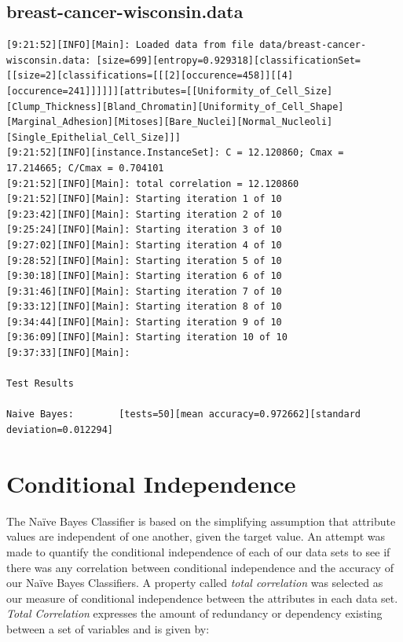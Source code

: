 \documentclass[10pt]{report}
\begin{document}
\subsection*{breast-cancer-wisconsin.data}
{\small
\begin{verbatim}
[9:21:52][INFO][Main]: Loaded data from file data/breast-cancer-wisconsin.data: [size=699][entropy=0.929318][classificationSet=[[size=2][classifications=[[[2][occurence=458]][[4][occurence=241]]]]]][attributes=[[Uniformity_of_Cell_Size][Clump_Thickness][Bland_Chromatin][Uniformity_of_Cell_Shape][Marginal_Adhesion][Mitoses][Bare_Nuclei][Normal_Nucleoli][Single_Epithelial_Cell_Size]]] 
[9:21:52][INFO][instance.InstanceSet]: C = 12.120860; Cmax = 17.214665; C/Cmax = 0.704101 
[9:21:52][INFO][Main]: total correlation = 12.120860 
[9:21:52][INFO][Main]: Starting iteration 1 of 10 
[9:23:42][INFO][Main]: Starting iteration 2 of 10 
[9:25:24][INFO][Main]: Starting iteration 3 of 10 
[9:27:02][INFO][Main]: Starting iteration 4 of 10 
[9:28:52][INFO][Main]: Starting iteration 5 of 10 
[9:30:18][INFO][Main]: Starting iteration 6 of 10 
[9:31:46][INFO][Main]: Starting iteration 7 of 10 
[9:33:12][INFO][Main]: Starting iteration 8 of 10 
[9:34:44][INFO][Main]: Starting iteration 9 of 10 
[9:36:09][INFO][Main]: Starting iteration 10 of 10 
[9:37:33][INFO][Main]: 

Test Results

Naive Bayes:		[tests=50][mean accuracy=0.972662][standard deviation=0.012294] 
\end{verbatim}
}


\section{Conditional Independence}
The Na\"{i}ve Bayes Classifier is based on the simplifying assumption
that attribute values are independent of one another, given the target
value. An attempt was made to quantify the conditional independence of
each of our data sets to see if there was any correlation between
conditional independence and the accuracy of our Na\"{i}ve Bayes
Classifiers. A property called \textit{total correlation} 
\cite{RefWorks:44} was selected as our measure of conditional
independence between the attributes in each data set. \textit{Total
  Correlation} expresses the amount of redundancy or dependency
existing between a set of variables and is given by: 
\end{document}
